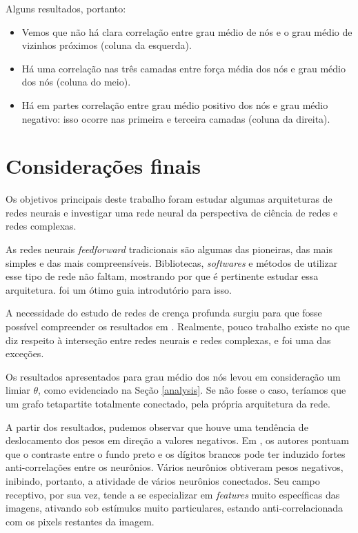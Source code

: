 \documentclass{article}
\begin{document}
            Alguns resultados, portanto:

            \begin{itemize}
                \item Vemos que não há clara correlação entre grau médio de nós e o grau médio de vizinhos próximos (coluna da esquerda).
                \item Há uma correlação nas três camadas entre força média dos nós e grau médio dos nós (coluna do meio).
                \item Há em partes correlação entre grau médio positivo dos nós e grau médio negativo: isso ocorre nas primeira e terceira camadas (coluna da direita).
            \end{itemize}

    \section{Considerações finais}

        Os objetivos principais deste trabalho foram estudar algumas arquiteturas de redes neurais e investigar uma rede neural da perspectiva de ciência de redes e redes complexas.

        As redes neurais \textit{feedforward} tradicionais são algumas das pioneiras, das mais simples e das mais compreensíveis.
        Bibliotecas, \textit{softwares} e métodos de utilizar esse tipo de rede não faltam, mostrando por que é pertinente estudar essa arquitetura.
        \cite{nielsen2015neural} foi um ótimo guia introdutório para isso.
        
        A necessidade do estudo de redes de crença profunda surgiu para que fosse possível compreender os resultados em \cite{testolin2018deep}.
        Realmente, pouco trabalho existe no que diz respeito à interseção entre redes neurais e redes complexas, e \cite{testolin2018deep} foi uma das exceções.

        Os resultados apresentados para grau médio dos nós levou em consideração um limiar $\theta$, como evidenciado na Seção \ref{analysis}.
        Se não fosse o caso, teríamos que um grafo tetapartite totalmente conectado, pela própria arquitetura da rede.

        A partir dos resultados, pudemos observar que houve uma tendência de deslocamento dos pesos em direção a valores negativos.
        Em \cite{testolin2018deep}, os autores pontuam que o contraste entre o fundo preto e os dígitos brancos pode ter induzido fortes anti-correlações entre os neurônios.
        Vários neurônios obtiveram pesos negativos, inibindo, portanto, a atividade de vários neurônios conectados.
        Seu campo receptivo, por sua vez, tende a se especializar em \textit{features} muito específicas das imagens, ativando sob estímulos muito particulares, estando anti-correlacionada com os pixels restantes da imagem.
\end{document}
